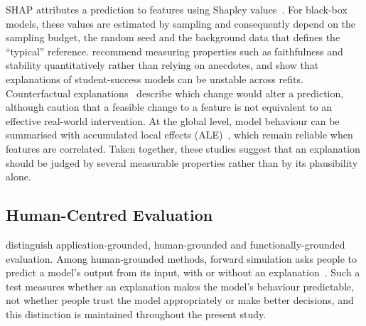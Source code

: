 SHAP attributes a prediction to features using Shapley values~\citep{lundberg2017shap}. For
black-box models, these values are estimated by sampling and consequently depend on the sampling
budget, the random seed and the background data that defines the ``typical'' reference.
\citet{nauta2023evaluation} recommend measuring properties such as faithfulness and stability
quantitatively rather than relying on anecdotes, and \citet{tiukhova2024stability} show that
explanations of student-success models can be unstable across refits. Counterfactual
explanations~\citep{wachter2017counterfactual} describe which change would alter a prediction,
although \citet{karimi2021recourse} caution that a feasible change to a feature is not equivalent
to an effective real-world intervention. At the global level, model behaviour can be summarised with
accumulated local effects (ALE)~\citep{apley2020ale}, which remain reliable when features are
correlated. Taken together, these studies suggest that an explanation should be judged by several
measurable properties rather than by its plausibility alone.

\subsection{Human-Centred Evaluation}

\citet{doshivelez2018considerations} distinguish application-grounded, human-grounded and
functionally-grounded evaluation. Among human-grounded methods, forward simulation asks people to
predict a model's output from its input, with or without an explanation~\citep{hase2020forward}.
Such a test measures whether an explanation makes the model's behaviour predictable, not whether
people trust the model appropriately or make better decisions, and this distinction is maintained
throughout the present study.
